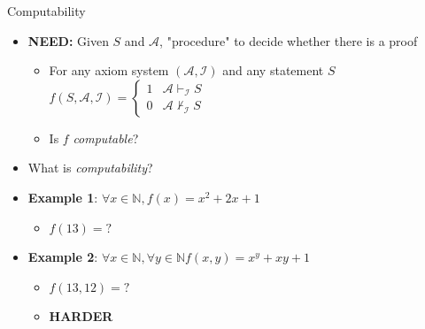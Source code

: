 \documentclass[usenames,dvipsnames]{beamer}
\newcommand{\NN}{\mathbb{N}}
\newcommand{\cA}{\mathcal{A}}
\newcommand{\cI}{\mathcal{I}}
\begin{document}
\begin{frame}{Computability}
    \begin{itemize}
        \item<1-> \textbf{NEED:} Given $S$ and $\cA$, "procedure" to decide whether there is a proof
        \begin{itemize}
            \item<2-> For any axiom system $(\cA,\cI)$ and any statement $S$
            $ f(S,\cA,\cI) = 
            \begin{cases} 
                1 & \cA\vdash_\cI S \\
                0 & \cA\nvdash_\cI S  
            \end{cases}
            $
            \item<3-> Is $f$ \emph{computable}?
        \end{itemize}
        \item<4-> What is \emph{computability}?
        \item<5-> \textbf{Example 1}: $\forall x\in\NN, f(x) = x^2 + 2x + 1$
        \begin{itemize}
            \item<6-> $f(13) = ?$
        \end{itemize}
        \item<7-> \textbf{Example 2}: $\forall x\in\NN,\forall y\in\NN f(x,y) = x^y + xy + 1$
        \begin{itemize}
            \item<8-> $f(13,12) = ?$
            \item<9-> \bf HARDER
        \end{itemize}
    \end{itemize}
\end{frame}
\end{document}
